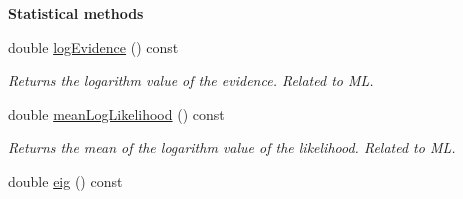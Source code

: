\begin{Indent}{\bf Statistical methods}
\begin{DoxyCompactItemize}
double \hyperlink{class_q_u_e_s_o_1_1_statistical_inverse_problem_a5b7801a55f4026c8a06558f19275f596}{log\-Evidence} () const 
\begin{DoxyCompactList}\small\item\em Returns the logarithm value of the evidence. Related to M\-L. \end{DoxyCompactList}\item 
double \hyperlink{class_q_u_e_s_o_1_1_statistical_inverse_problem_a1d97b50dca7034acfef4df209b94838c}{mean\-Log\-Likelihood} () const 
\begin{DoxyCompactList}\small\item\em Returns the mean of the logarithm value of the likelihood. Related to M\-L. \end{DoxyCompactList}\item 
double \hyperlink{class_q_u_e_s_o_1_1_statistical_inverse_problem_a039958964641a79de68845ae3a00c218}{eig} () const 
\end{DoxyCompactItemize}
\end{Indent}

